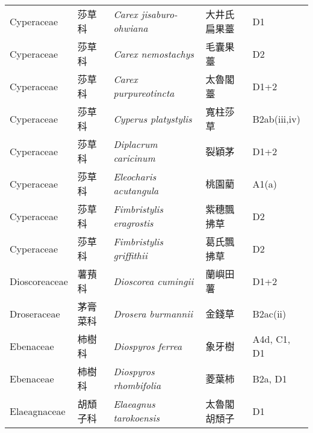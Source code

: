 {\begin{longtable}{p{2.5cm}p{2.5cm}p{4.5cm}p{2.5cm}p{3cm}}
    Cyperaceae & 莎草科 & \textit{Carex jisaburo-ohwiana}  & 大井氏扁果薹 & D1 \index{Carex@\textit{Carex}!jisaburo-ohwiana@\textit{jisaburo-ohwiana}}  \index{大井氏扁果薹} \\
    Cyperaceae & 莎草科 & \textit{Carex nemostachys}  & 毛囊果薹 & D2 \index{Carex@\textit{Carex}!nemostachys@\textit{nemostachys}}  \index{毛囊果薹} \\
    Cyperaceae & 莎草科 & \textit{Carex purpureotincta}  & 太魯閣薹 & D1+2 \index{Carex@\textit{Carex}!purpureotincta@\textit{purpureotincta}}  \index{太魯閣薹} \\
    Cyperaceae & 莎草科 & \textit{Cyperus platystylis}  & 寬柱莎草 & B2ab(iii,iv) \index{Cyperus@\textit{Cyperus}!platystylis@\textit{platystylis}}  \index{寬柱莎草} \\
    Cyperaceae & 莎草科 & \textit{Diplacrum caricinum}  & 裂穎茅 & D1+2 \index{Diplacrum@\textit{Diplacrum}!caricinum@\textit{caricinum}}  \index{裂穎茅} \\
    Cyperaceae & 莎草科 & \textit{Eleocharis acutangula}  & 桃園藺 & A1(a) \index{Eleocharis@\textit{Eleocharis}!acutangula@\textit{acutangula}}  \index{桃園藺} \\
    Cyperaceae & 莎草科 & \textit{Fimbristylis eragrostis}  & 紫穗飄拂草 & D2 \index{Fimbristylis@\textit{Fimbristylis}!eragrostis@\textit{eragrostis}}  \index{紫穗飄拂草} \\
    Cyperaceae & 莎草科 & \textit{Fimbristylis griffithii}  & 葛氏飄拂草 & D2 \index{Fimbristylis@\textit{Fimbristylis}!griffithii@\textit{griffithii}}  \index{葛氏飄拂草} \\
    Dioscoreaceae & 薯蕷科 & \textit{Dioscorea cumingii}  & 蘭嶼田薯 & D1+2 \index{Dioscorea@\textit{Dioscorea}!cumingii@\textit{cumingii}}  \index{蘭嶼田薯} \\
    Droseraceae & 茅膏菜科 & \textit{Drosera burmannii}  & 金錢草 & B2ac(ii) \index{Drosera@\textit{Drosera}!burmannii@\textit{burmannii}}  \index{金錢草} \\
    Ebenaceae & 柿樹科 & \textit{Diospyros ferrea}  & 象牙樹 & A4d, C1, D1 \index{Diospyros@\textit{Diospyros}!ferrea@\textit{ferrea}}  \index{象牙樹} \\
    Ebenaceae & 柿樹科 & \textit{Diospyros rhombifolia}  & 菱葉柿 & B2a, D1 \index{Diospyros@\textit{Diospyros}!rhombifolia@\textit{rhombifolia}}  \index{菱葉柿} \\
    Elaeagnaceae & 胡頹子科 & \textit{Elaeagnus tarokoensis}  & 太魯閣胡頹子 & D1 \index{Elaeagnus@\textit{Elaeagnus}!tarokoensis@\textit{tarokoensis}}  \index{太魯閣胡頹子} \\

\end{longtable}}

